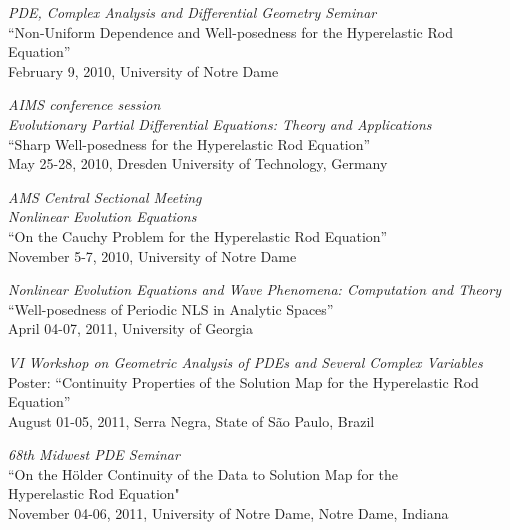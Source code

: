 \documentclass[10pt,oneside]{amsart}
\renewcommand{\section}[2]%
{\vspace{0.7cm}%
\hspace{0in}%
\marginpar{\scshape #1}#2}
\begin{document}
\section{Invited Talks}
\vspace{-0.4cm}
\begin{compactenum}[1)]
\item \textit{PDE, Complex Analysis and Differential Geometry Seminar} \\
``Non-Uniform Dependence and Well-posedness for the Hyperelastic Rod Equation'' \\
February 9, 2010, University of 
Notre Dame
\\
\item \textit{AIMS conference session \\ 
Evolutionary Partial Differential Equations: Theory and Applications} \\
``Sharp Well-posedness for the Hyperelastic Rod Equation''\\ 
May 25-28, 2010, Dresden University of Technology, Germany  \\

\item \textit{AMS Central Sectional Meeting \\ Nonlinear Evolution Equations} \\
``On the Cauchy Problem for the Hyperelastic Rod Equation'' \\
November 5-7, 2010, University of Notre Dame \\

\item \textit{Nonlinear Evolution Equations and Wave Phenomena: Computation and Theory} \\
``Well-posedness of Periodic NLS in Analytic Spaces'' \\
April 04-07, 2011, University of Georgia \\

\item \textit{VI Workshop on Geometric Analysis of PDEs and Several Complex Variables}
\\
Poster: ``Continuity Properties of the Solution Map for the Hyperelastic Rod Equation''
\\
August 01-05, 2011, Serra Negra, State of S{\~a}o Paulo, Brazil \\

\item \textit{68th Midwest PDE Seminar}
\\
``On the H\"older Continuity of the Data to Solution Map for the \\ Hyperelastic
Rod Equation"
\\
November 04-06, 2011, University of Notre Dame, Notre Dame, Indiana \\
\end{compactenum}
\end{document}
